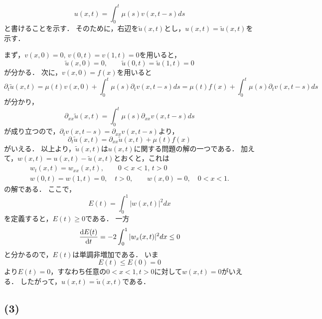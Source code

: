 \documentclass[a4paper,11pt]{jsarticle}
\begin{document}
\begin{equation}
  u(x,t) = \int_0^t  \mu(s)v(x,t-s) ds
\end{equation}
と書けることを示す．
そのために，右辺を$\tilde{u}(x,t)$とし，$u(x,t)=\tilde{u}(x,t)$を示す．

まず，$v(x,0)=0,\,v(0,t)=v(1,t)=0$を用いると，
\begin{equation}
  \tilde{u}(x,0) = 0,\qquad \tilde{u}(0,t) = \tilde{u}(1,t) = 0
\end{equation}
が分かる．
次に，$v(x,0)=f(x)$を用いると
\begin{equation}
  \partial_t \tilde{u}(x,t) =  \mu(t)v(x,0) + \int_0^t \mu(s) \partial_t v(x,t-s) ds = \mu(t)f(x) + \int_0^t \mu(s) \partial_t v(x,t-s) ds
\end{equation}
が分かり，
\begin{equation}
  \partial_{xx} \tilde{u}(x,t) =\int_0^t \mu(s)\partial_{xx} v(x,t-s) ds
\end{equation}
が成り立つので，$\partial_t v(x,t-s)=\partial_{xx} v(x,t-s)$より，
\begin{equation}
  \partial_t \tilde{u}(x,t) = \partial_{xx} \tilde{u}(x,t) + \mu(t)f(x)
\end{equation}
がいえる．
以上より，$\tilde{u}(x,t)$は$u(x,t)$に関する問題の解の一つである．
加えて，$w(x,t)=u(x,t)-\tilde{u}(x,t)$とおくと，これは
\begin{align}
  w_t(x,t) = w_{xx}(x,t),\qquad 0<x<1,\,t>0 \\
  w(0,t)=w(1,t)=0,\quad t>0,\qquad w(x,0)=0,\quad 0<x<1.
\end{align}
の解である．
ここで，
\begin{equation}
  E(t) = \int_0^1 |w(x,t)|^2 dx
\end{equation}
を定義すると，$E(t)\ge 0$である．
一方
\begin{equation}
  \dv{E(t)}{t} =  -2\int_0^1 |w_x(x,t)|^2 dx \le 0 
\end{equation}
と分かるので，$E(t)$は単調非増加である．
いま
\begin{equation}
  E(t) \le E(0) = 0
\end{equation}
より$E(t)=0$，すなわち任意の$0<x<1,t>0$に対して$w(x,t)=0$がいえる．
したがって，$u(x,t)=\tilde{u}(x,t)$である．

\subsection*{(3)}
\end{document}
